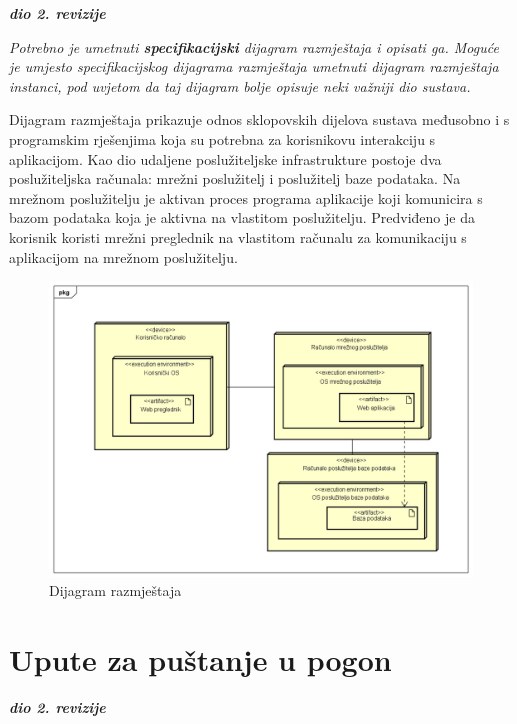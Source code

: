			\textbf{\textit{dio 2. revizije}}
			
			 \textit{Potrebno je umetnuti \textbf{specifikacijski} dijagram razmještaja i opisati ga. Moguće je umjesto specifikacijskog dijagrama razmještaja umetnuti dijagram razmještaja instanci, pod uvjetom da taj dijagram bolje opisuje neki važniji dio sustava.}
			 
			 \indent Dijagram razmještaja prikazuje odnos sklopovskih dijelova sustava međusobno i s programskim rješenjima koja su potrebna za korisnikovu interakciju s aplikacijom. Kao dio udaljene poslužiteljske infrastrukture postoje dva poslužiteljska računala: mrežni poslužitelj i poslužitelj baze podataka. Na mrežnom poslužitelju je aktivan proces programa aplikacije koji komunicira s bazom podataka koja je aktivna na vlastitom poslužitelju. Predviđeno je da korisnik koristi mrežni preglednik na vlastitom računalu za komunikaciju s aplikacijom na mrežnom poslužitelju.
			 
			 \begin{figure} [hbt!]
			 	\includegraphics[width=\linewidth]{Slike/DeploymentDiagram}
			 	\caption{Dijagram razmještaja}
			 \end{figure}
			
			\eject 
		
		\section{Upute za puštanje u pogon}
		
			\textbf{\textit{dio 2. revizije}}\\
		

